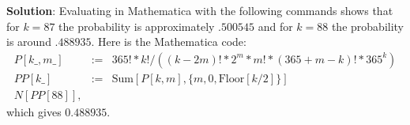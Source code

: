\documentclass[11pt]{article}
\begin{document}
\begin{enumerate}
\begin{enumerate}
{\bf Solution}: Evaluating in Mathematica with the following commands shows that for $k=87$ the probability is approximately $.500545$ and for $k=88$ the probability is around $.488935$.  Here is the Mathematica code:
\begin{eqnarray*}
P[k\_, m\_] & := & 365!*k!/((k - 2 m)! *2^m*m!*(365 + m - k)!*365^k) \\
PP[k\_] & := & \text{Sum}[P[k, m], \{m, 0, \text{Floor}[k/2]\}] \\
N[PP[88]],
\end{eqnarray*}
which gives $0.488935$.

\end{enumerate}





\end{enumerate}
\end{document}
